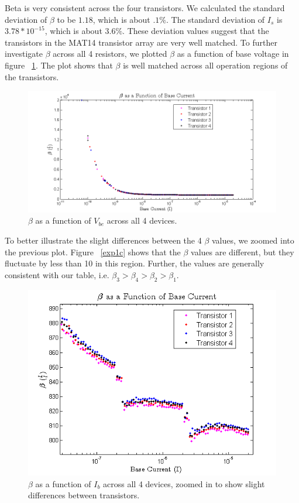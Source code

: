 \documentclass{article}
\begin{document}
Beta is very consistent across the four transistors. We calculated the standard deviation of $\beta$ to be $1.18$, which is about $.1\%$. The standard deviation of $I_{s}$ is $3.78*10^{-15}$, which is about $3.6\%$. These deviation values suggest that the transistors in the MAT14 transistor array are very well matched. To further investigate $\beta$ across all 4 resistors, we plotted $\beta$ as a function of base voltage in figure ~\ref{fig:exp1c}. The plot shows that $\beta$ is well matched across all operation regions of the transistors.
\begin{figure}[H]
\begin{center}
\includegraphics[scale=.8]{exp1c.png}
\caption{$\beta$ as a function of $V_{be}$ across all 4 devices.}
\label{fig:exp1c}
\end{center}
\end{figure}

To better illustrate the slight differences between the 4 $\beta$ values, we zoomed into the previous plot. Figure ~\ref{exp1c} shows that the $\beta$ values are different, but they fluctuate by less than 10 in this region. Further, the values are generally consistent with our table, i.e. $\beta_{3}>\beta_{4}>\beta_{2}>\beta_{1}$.

\begin{figure}[H]
\begin{center}
\includegraphics[scale=.8]{exp1c2.png}
\caption{$\beta$ as a function of $I_{b}$ across all 4 devices, zoomed in to show slight differences between transistors.}
\label{fig:exp1c2}
\end{center}
\end{figure}
\end{document}
